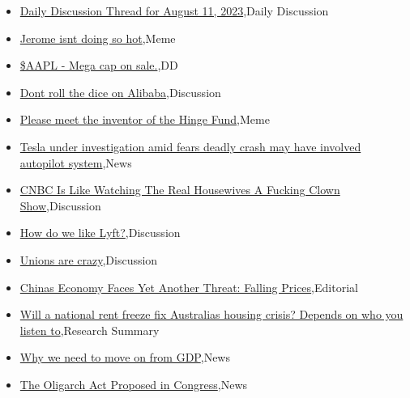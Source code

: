 \documentclass{article}%
\begin{document}
%
\begin{itemize}%
\item%
\href{https://reddit.com/r/wallstreetbets/comments/15o4mku/daily\_discussion\_thread\_for\_august\_11\_2023/}{Daily Discussion Thread for August 11, 2023},Daily Discussion%
\item%
\href{https://reddit.com/r/wallstreetbets/comments/15nz0vu/jerome\_isnt\_doing\_so\_hot/}{Jerome isnt doing so hot},Meme%
\item%
\href{https://reddit.com/r/wallstreetbets/comments/15nx5rc/aapl\_mega\_cap\_on\_sale/}{\$AAPL - Mega cap on sale.},DD%
\item%
\href{https://reddit.com/r/wallstreetbets/comments/15nvo89/dont\_roll\_the\_dice\_on\_alibaba/}{Dont roll the dice on Alibaba},Discussion%
\item%
\href{https://reddit.com/r/wallstreetbets/comments/15ntu1g/please\_meet\_the\_inventor\_of\_the\_hinge\_fund/}{Please meet the inventor of the Hinge Fund},Meme%
\item%
\href{https://reddit.com/r/wallstreetbets/comments/15nsx5b/tesla\_under\_investigation\_amid\_fears\_deadly\_crash/}{Tesla under investigation amid fears deadly crash may have involved autopilot system},News%
\item%
\href{https://reddit.com/r/wallstreetbets/comments/15nrcug/cnbc\_is\_like\_watching\_the\_real\_housewives\_a/}{CNBC Is Like Watching The Real Housewives A Fucking Clown Show},Discussion%
\item%
\href{https://reddit.com/r/StockMarket/comments/15no0rf/how\_do\_we\_like\_lyft/}{How do we like Lyft?},Discussion%
\item%
\href{https://reddit.com/r/StockMarket/comments/15nnt9b/unions\_are\_crazy/}{Unions are crazy},Discussion%
\item%
\href{https://reddit.com/r/Economics/comments/15np4lt/chinas\_economy\_faces\_yet\_another\_threat\_falling/}{Chinas Economy Faces Yet Another Threat: Falling Prices},Editorial%
\item%
\href{https://reddit.com/r/Economics/comments/15nouvk/will\_a\_national\_rent\_freeze\_fix\_australias/}{Will a national rent freeze fix Australias housing crisis? Depends on who you listen to},Research Summary%
\item%
\href{https://reddit.com/r/Economics/comments/15nokrs/why\_we\_need\_to\_move\_on\_from\_gdp/}{Why we need to move on from GDP},News%
\item%
\href{https://reddit.com/r/Economics/comments/15nnnzh/the\_oligarch\_act\_proposed\_in\_congress/}{The Oligarch Act Proposed in Congress},News%

\end{itemize}
\end{document}
